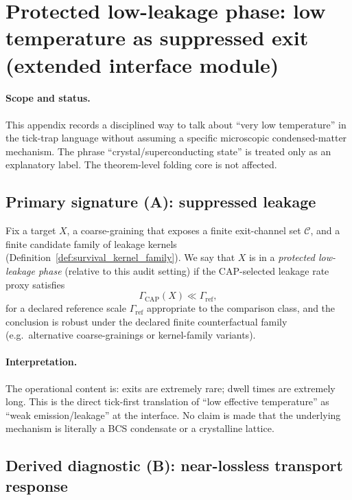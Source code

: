 \section{Protected low-leakage phase: low temperature as suppressed exit (extended interface module)}
\label{app:protected_low_leakage_phase}

\paragraph{Scope and status.}
\AuditTag This appendix records a disciplined way to talk about ``very low temperature'' in the tick-trap language without assuming a specific microscopic condensed-matter mechanism.
The phrase ``crystal/superconducting state'' is treated only as an explanatory label.
The theorem-level folding core is not affected.

\subsection{Primary signature (A): suppressed leakage}
\label{subsec:pll_primary_signature}

\begin{definition}
\label{def:protected_low_leakage_phase}
Fix a target $X$, a coarse-graining that exposes a finite exit-channel set $\mathcal C$, and a finite candidate family of leakage kernels (Definition~\ref{def:survival_kernel_family}).
We say that $X$ is in a \emph{protected low-leakage phase} (relative to this audit setting) if the CAP-selected leakage rate proxy satisfies
\[
\Gamma_{\mathrm{CAP}}(X)\ll \Gamma_{\mathrm{ref}},
\]
for a declared reference scale $\Gamma_{\mathrm{ref}}$ appropriate to the comparison class, and the conclusion is robust under the declared finite counterfactual family (e.g.\ alternative coarse-grainings or kernel-family variants).
\end{definition}

\paragraph{Interpretation.}
\AuditTag The operational content is: exits are extremely rare; dwell times are extremely long.
This is the direct tick-first translation of ``low effective temperature'' as ``weak emission/leakage'' at the interface.
No claim is made that the underlying mechanism is literally a BCS condensate or a crystalline lattice.

\subsection{Derived diagnostic (B): near-lossless transport response}
\label{subsec:pll_derived_transport}

